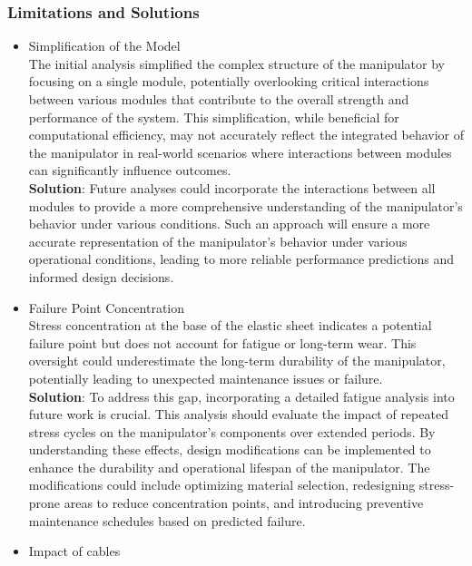 \subsubsection{Limitations and Solutions}
\begin{itemize}
    \item Simplification of the Model \\
    The initial analysis simplified the complex structure of the manipulator by focusing on a single module, 
    potentially overlooking critical interactions between various modules that contribute to the overall 
    strength and performance of the system. This simplification, while beneficial for computational efficiency, 
    may not accurately reflect the integrated behavior of the manipulator in real-world scenarios where interactions 
    between modules can significantly influence outcomes. \\
    \textbf{Solution}: Future analyses could incorporate the interactions between all modules to provide a more 
    comprehensive understanding of the manipulator's behavior under various conditions. Such an approach will 
    ensure a more accurate representation of the manipulator's behavior under various operational conditions, 
    leading to more reliable performance predictions and informed design decisions. \\
    \item Failure Point Concentration \\
    Stress concentration at the base of the elastic sheet indicates a potential failure point but does not 
    account for fatigue or long-term wear. This oversight could underestimate the long-term durability of 
    the manipulator, potentially leading to unexpected maintenance issues or failure. \\
    \textbf{Solution}: To address this gap, incorporating a detailed fatigue analysis into future work is 
    crucial. This analysis should evaluate the impact of repeated stress cycles on the manipulator's components 
    over extended periods. By understanding these effects, design modifications can be implemented to enhance 
    the durability and operational lifespan of the manipulator. The modifications could include optimizing 
    material selection, redesigning stress-prone areas to reduce concentration points, and introducing preventive 
    maintenance schedules based on predicted failure. \\
    \item Impact of cables \\

\end{itemize}
